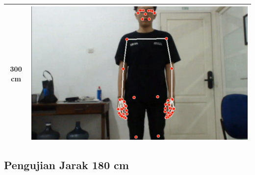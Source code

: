 \begin{longtable}{|c|c|}
  \hline
  300 cm            & \includegraphics[scale=0.15]{gambar/bab4-jarak300.png}                 \\
  \hline
\end{longtable}

\newpage
\subsection{Pengujian Jarak 180 cm}
\label{sec:analisisjarak1}

